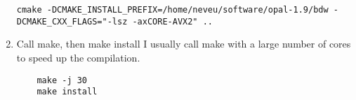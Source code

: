 \documentclass{iitthesis}
\begin{document}
\begin{enumerate}[label=Step \arabic*:]
\begin{lstlisting}
cmake -DCMAKE_INSTALL_PREFIX=/home/neveu/software/opal-1.9/bdw -DCMAKE_CXX_FLAGS="-lsz -axCORE-AVX2" ..
\end{lstlisting}

    \item Call make, then make install
I usually call make with a large number of cores to speed up the compilation.    
\begin{lstlisting}
	make -j 30 
	make install
\end{lstlisting}

\end{enumerate}





\newpage
%
%


\end{document}
